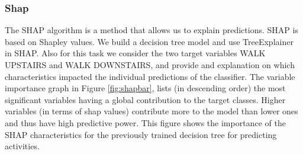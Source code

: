 \documentclass[10pt, a4paper, twocolumn]{article}
\begin{document}
\subsubsection*{Shap}
The SHAP algorithm is a method that allows us to explain predictions. SHAP is based on Shapley values.  We build a decision tree model and use TreeExplainer in SHAP. Also for this task we consider the two target variables WALK UPSTAIRS and WALK DOWNSTAIRS, and provide and explanation on which characteristics impacted the individual predictions of the classifier.
The variable importance graph in Figure \ref{fig:shapbar}, lists (in descending order) the most significant variables having a global contribution to the target classes. Higher variables (in terms of shap values) contribute more to the model than lower ones and thus have high predictive power. This figure shows the importance of the SHAP characteristics for the previously trained decision tree for predicting activities.

\end{document}
